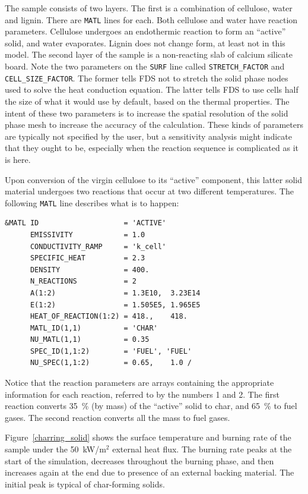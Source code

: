 \documentclass[11pt]{book}
\newcommand{\ct}{\tt\small}
\begin{document}
\noindent
The sample consists of two layers. The first is a combination of cellulose, water and lignin. There
are {\ct MATL} lines for each. Both cellulose and water have reaction parameters. Cellulose undergoes
an endothermic reaction to form an ``active'' solid, and water evaporates. Lignin does not change form, at least
not in this model. The second layer of the sample is a non-reacting slab of calcium silicate board. Note the
two parameters on the {\ct SURF} line called {\ct STRETCH\_FACTOR} and {\ct CELL\_SIZE\_FACTOR}. The former
tells FDS not to stretch the solid phase nodes used to solve the heat conduction equation. The latter tells FDS
to use cells half the size of what it would use by default, based on the thermal properties. The intent of these
two parameters is to increase the spatial resolution of the solid phase mesh to increase the accuracy of the
calculation. These kinds of parameters are typically not specified by the user,
but a sensitivity analysis might indicate that
they ought to be, especially when the reaction sequence is complicated as it is here.

Upon conversion of the virgin cellulose to its ``active'' component, this latter solid material undergoes
two reactions that occur at two different temperatures. The following {\ct MATL} line describes what is to
happen:

\scriptsize
\begin{verbatim}
&MATL ID                    = 'ACTIVE'
      EMISSIVITY            = 1.0
      CONDUCTIVITY_RAMP     = 'k_cell'
      SPECIFIC_HEAT         = 2.3
      DENSITY               = 400.
      N_REACTIONS           = 2
      A(1:2)                = 1.3E10,  3.23E14
      E(1:2)                = 1.505E5, 1.965E5
      HEAT_OF_REACTION(1:2) = 418.,    418.
      MATL_ID(1,1)          = 'CHAR'
      NU_MATL(1,1)          = 0.35
      SPEC_ID(1,1:2)        = 'FUEL', 'FUEL'
      NU_SPEC(1,1:2)        = 0.65,    1.0 /
\end{verbatim} \normalsize

\noindent Notice that the reaction parameters are arrays containing the appropriate information for each reaction,
referred to by the numbers 1 and 2. The first reaction converts 35~\% (by mass) of the ``active'' solid to
char, and 65~\% to fuel gases. The second reaction converts all the mass to fuel gases.

Figure~\ref{charring_solid} shows the surface temperature and burning rate of the sample
under the 50~kW/m$^2$ external heat flux. The burning rate peaks
at the start of the simulation, decreases throughout the burning
phase, and then increases again at the end due to presence of an external
backing material. The initial peak is typical of char-forming solids.
\end{document}
